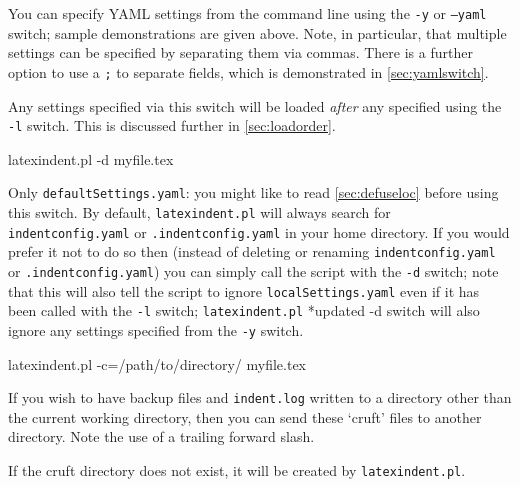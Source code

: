  \label{page:yamlswitch}You%
  can specify YAML settings from the command line
 using the \texttt{-y} or \texttt{--yaml} switch; sample demonstrations are given above.
 Note, in particular, that multiple settings can be specified by separating them via
 commas. There is a further option to use a \texttt{;} to separate fields, which is
 demonstrated in \vref{sec:yamlswitch}.

 Any settings specified via this switch will be loaded \emph{after} any specified using
 the \texttt{-l} switch. This is discussed further in \vref{sec:loadorder}.  

 \begin{commandshell}
latexindent.pl -d myfile.tex
\end{commandshell}

 Only \texttt{defaultSettings.yaml}: you might like to read \cref{sec:defuseloc} before
 using this switch. By default, \texttt{latexindent.pl} will always search for
 \texttt{indentconfig.yaml} or \texttt{.indentconfig.yaml} in your home directory. If you
 would prefer it not to do so then (instead of deleting or renaming
 \texttt{indentconfig.yaml} or \texttt{.indentconfig.yaml}) you can simply call the
 script with the \texttt{-d} switch; note that this will also tell the script to ignore
 \texttt{localSettings.yaml} even if it has been called with the \texttt{-l} switch;
 \texttt{latexindent.pl} *{updated -d switch} will also ignore any
 settings specified from the \texttt{-y} switch.%


 \begin{commandshell}
latexindent.pl -c=/path/to/directory/ myfile.tex
\end{commandshell}

 If you wish to have backup files and \texttt{indent.log} written to a directory other
 than the current working directory, then you can send these `cruft' files to another
 directory. Note the use of a trailing forward slash. %

 If the cruft directory does not exist, it will be created by \texttt{latexindent.pl}.


